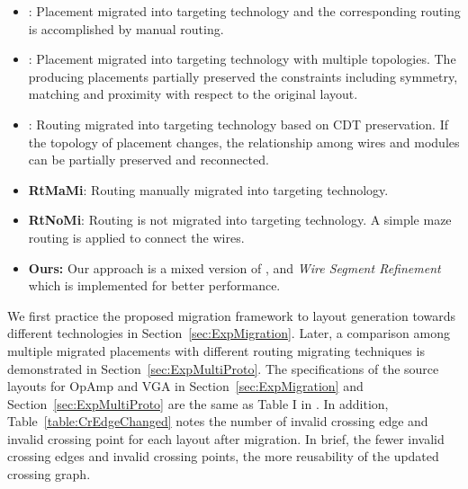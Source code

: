     \begin{itemize}
      \item {\bf \cite{msc-bhattacharya-tcad06}}: Placement migrated into targeting technology and the corresponding routing is accomplished by manual routing.
      \item {\bf \cite{ALP_YPWeng_iccad2011}}: Placement migrated into targeting technology with multiple topologies. The producing placements partially preserved the constraints including symmetry, matching and proximity with respect to the original layout.
      \item {\bf \cite{Chin_DMR_ICCAD2013}}: Routing migrated into targeting technology based on CDT preservation. If the topology of placement changes, the relationship among wires and modules can be partially preserved and reconnected.
      \item {\bf RtMaMi}: Routing manually migrated into targeting technology. 
      \item {\bf RtNoMi}: Routing is not migrated into targeting technology. A simple maze routing is applied to connect the wires. 
      \item {\bf Ours:}  Our approach is a mixed version of \cite{ALP_YPWeng_iccad2011}, \cite{Chin_DMR_ICCAD2013} and {\it Wire Segment Refinement} which is implemented for better performance.
    \end{itemize}

    We first practice the proposed migration framework to layout generation towards different technologies in Section~\ref{sec:ExpMigration}. Later, a comparison among multiple migrated placements with different routing migrating techniques is demonstrated in Section~\ref{sec:ExpMultiProto}. The specifications of the source layouts for OpAmp and VGA in Section~\ref{sec:ExpMigration} and Section~\ref{sec:ExpMultiProto} are the same as Table I in \cite{Chin_DMR_ICCAD2013}. In addition, Table~\ref{table:CrEdgeChanged} notes the number of invalid crossing edge and invalid crossing point for each layout after migration. In brief, the fewer invalid crossing edges and invalid crossing points, the more reusability of the updated crossing graph.


